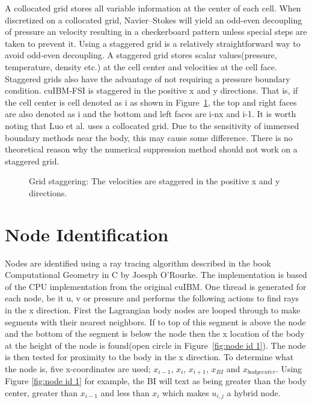 A collocated grid stores all variable information at the center of each cell.
When discretized on a collocated grid, Navier--Stokes will yield an odd-even decoupling of pressure an velocity resulting in a checkerboard pattern unless special steps are taken to prevent it. 
Using a staggered grid is a relatively straightforward way to avoid odd-even decoupling.
A staggered grid stores scalar values(pressure, temperature, density etc.) at the cell center and velocities at the cell face. 
Staggered grids also have the advantage of not requiring a pressure boundary condition.
cuIBM-FSI is staggered in the positive x and y directions. 
That is, if the cell center is cell denoted as i as shown in Figure~\ref{fig:stagger}, the top and right faces are also denoted as i and the bottom and left faces are i-nx and i-1. 
It is worth noting that Luo et al.\cite{Luo:2012gx} uses a collocated grid.
Due to the sensitivity of immersed boundary methods near the body, this may cause some difference.
There is no theoretical reason why the numerical suppression method should not work on a staggered grid.
\begin{figure}[!htb]
	\centering
	
	\caption{Grid staggering: The velocities are staggered in the positive x and y directions.}
	\label{fig:stagger}
\end{figure}

\section{Node Identification}
Nodes are identified using a ray tracing algorithm described in the book Computational Geometry in C by Joesph O'Rourke\cite{o1998computational}.
The implementation is based of the CPU implementation from the original cuIBM. 
One thread is generated for each node, be it u, v or pressure and performs the following actions to find rays in the x direction.
First the Lagrangian body nodes are looped through to make segments with their nearest neighbors.
If to top of this segment is above the node and the bottom of the segment is below the node then the x location of the body at the height of the node is found(open circle in Figure~\ref{fig:node id 1}).
The node is then tested for proximity to the body in the x direction. 
To determine what the node is, five x-coordinates are used; $x_{i-1}$, $x_{i}$, $x_{i+1}$, $x_{BI}$ and $x_{body center}$. 
Using Figure \ref{fig:node id 1} for example, the BI will text as being greater than the body center, greater than $x_{i-1}$ and less than $x_{i}$ which makes $u_{i,j}$ a hybrid node. 

